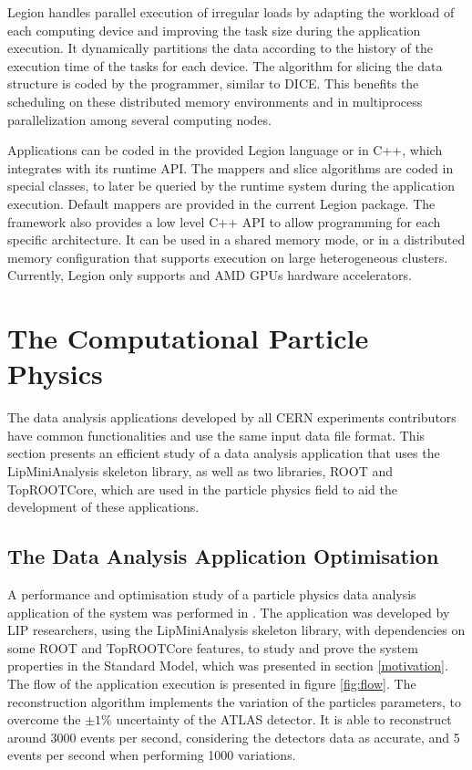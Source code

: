 Legion handles parallel execution of irregular loads by adapting the workload of each computing device and improving the task size during the application execution. It dynamically partitions the data according to the history of the execution time of the tasks for each device. The algorithm for slicing the data structure is coded by the programmer, similar to DICE. This benefits the scheduling on these distributed memory environments and in multiprocess parallelization among several computing nodes.

Applications can be coded in the provided Legion language or in C++, which integrates with its runtime API. The mappers and slice algorithms are coded in special classes, to later be queried by the runtime system during the application execution. Default mappers are provided in the current Legion package. The framework also provides a low level C++ API to allow programming for each specific architecture. It can be used in a shared memory mode, or in a distributed memory configuration that supports execution on large heterogeneous clusters. Currently, Legion only supports \nvidia and AMD GPUs hardware accelerators.

\section{The Computational Particle Physics}
\label{particle_frameworks}

The data analysis applications developed by all CERN experiments contributors have common functionalities and use the same input data file format. This section presents an efficient study of a data analysis application that uses the LipMiniAnalysis skeleton library, as well as two libraries, ROOT and TopROOTCore, which are used in the particle physics field to aid the development of these applications.

\subsection*{The \tth Data Analysis Application Optimisation}

A performance and optimisation study of a particle physics data analysis application of the \ttH system was performed in \cite{Msc:AMP,paperAMP}. The \tth application was developed by LIP researchers, using the LipMiniAnalysis skeleton library, with dependencies on some ROOT and TopROOTCore features, to study and prove the \ttH system properties in the Standard Model, which was presented in section \ref{motivation}. The flow of the application execution is presented in figure \ref{fig:flow}. The reconstruction algorithm implements the variation of the particles parameters, to overcome the $\pm1\%$ uncertainty of the ATLAS detector. It is able to reconstruct around 3000 events per second, considering the detectors data as accurate, and 5 events per second when performing 1000 variations.

